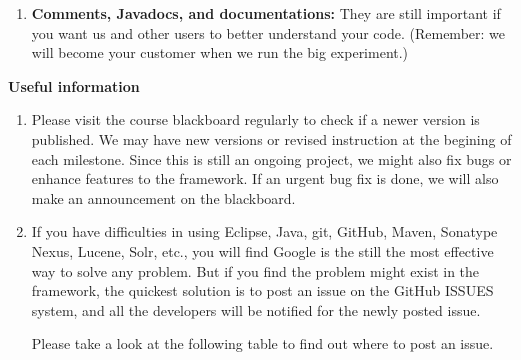 \documentclass[oneside]{memoir}
\begin{document}
\begin{titlingpage}
\begin{minipage}{1.2\textwidth}
\begin{enumerate}
\item \textbf{Comments, Javadocs, and documentations:} They are still important
if you want us and other users to better understand your code. (Remember: we
will become your customer when we run the big experiment.)

\end{enumerate}

\end{minipage}
\hspace{-0.1\textwidth}

\hspace{-0.1\textwidth}
\begin{minipage}{1.2\textwidth}

\textbf{Useful information}
\begin{enumerate}

\item Please visit the course blackboard regularly to check if a newer version
is published. We may have new versions or revised instruction at the begining of
each milestone. Since this is still an ongoing project, we might also fix bugs
or enhance features to the framework. If an urgent bug fix is done, we will also
make an announcement on the blackboard.

\item If you have difficulties in using Eclipse, Java, git, GitHub, Maven,
Sonatype Nexus, Lucene, Solr, etc., you will find Google is the still the most
effective way to solve any problem. But if you find the problem might exist in
the framework, the quickest solution is to post an issue on the GitHub ISSUES
system, and all the developers will be notified for the newly posted issue.

Please take a look at the following table to find out where to post an issue.

\vspace{1em}


\end{enumerate}
\end{minipage}
\end{titlingpage}
\end{document}
